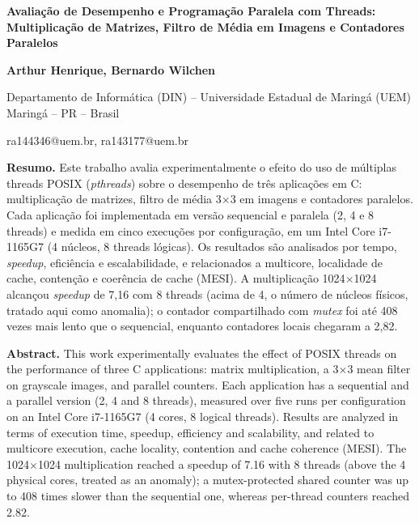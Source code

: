 \documentclass[12pt,a4paper]{article}
\makeatletter
\newcommand{\tx}{$\times$}
\newcommand{\autores}{Arthur Henrique, Bernardo Wilchen}
\newcommand{\emails}{ra144346@uem.br, ra143177@uem.br}
\makeatother
\begin{document}
\begin{center}
  \vspace*{12pt}
  {\fontsize{16}{19}\selectfont\bfseries Avaliação de Desempenho e Programação Paralela com Threads: Multiplicação de Matrizes, Filtro de Média em Imagens e Contadores Paralelos\par}
  \vspace{12pt}
  {\bfseries\autores\par}
  \vspace{12pt}
  Departamento de Informática (DIN) -- Universidade Estadual de Maringá (UEM)\\
  Maringá -- PR -- Brasil\par
  \vspace{6pt}
  {\fontsize{10}{12}\ttfamily\emails\par}
  \vspace{6pt}
\end{center}

\begin{list}{}{\leftmargin=0.8cm\rightmargin=0.8cm\setlength{\itemsep}{0pt}\setlength{\parsep}{0pt}\setlength{\topsep}{0pt}}
\item[]\noindent\textbf{Resumo.} Este trabalho avalia experimentalmente o efeito do uso de múltiplas threads POSIX (\emph{pthreads}) sobre o desempenho de três aplicações em C: multiplicação de matrizes, filtro de média 3\tx3 em imagens e contadores paralelos. Cada aplicação foi implementada em versão sequencial e paralela (2, 4 e 8 threads) e medida em cinco execuções por configuração, em um Intel Core i7-1165G7 (4 núcleos, 8 threads lógicas). Os resultados são analisados por tempo, \emph{speedup}, eficiência e escalabilidade, e relacionados a multicore, localidade de cache, contenção e coerência de cache (MESI). A multiplicação 1024\tx1024 alcançou \emph{speedup} de 7,16 com 8 threads (acima de 4, o número de núcleos físicos, tratado aqui como anomalia); o contador compartilhado com \emph{mutex} foi até 408 vezes mais lento que o sequencial, enquanto contadores locais chegaram a 2,82.

\vspace{6pt}
\item[]\noindent\textbf{Abstract.} This work experimentally evaluates the effect of POSIX threads on the performance of three C applications: matrix multiplication, a 3\tx3 mean filter on grayscale images, and parallel counters. Each application has a sequential and a parallel version (2, 4 and 8 threads), measured over five runs per configuration on an Intel Core i7-1165G7 (4 cores, 8 logical threads). Results are analyzed in terms of execution time, speedup, efficiency and scalability, and related to multicore execution, cache locality, contention and cache coherence (MESI). The 1024\tx1024 multiplication reached a speedup of 7.16 with 8 threads (above the 4 physical cores, treated as an anomaly); a mutex-protected shared counter was up to 408 times slower than the sequential one, whereas per-thread counters reached 2.82.
\end{list}
\end{document}
